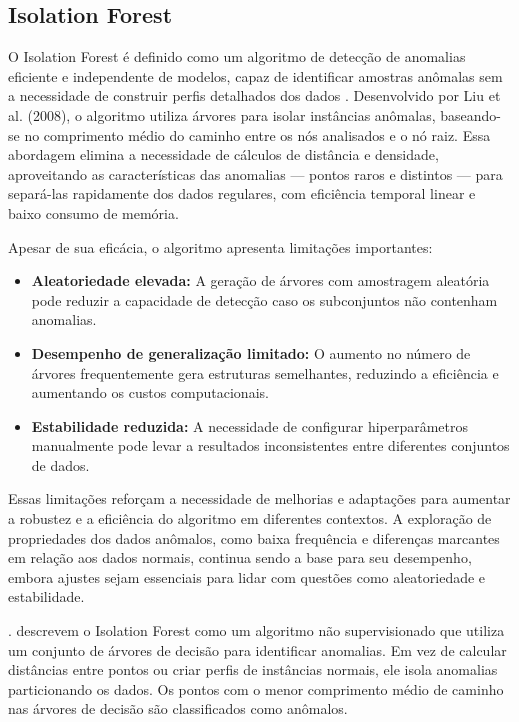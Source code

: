 \documentclass[12pt,a4paper]{article}
\begin{document}
\subsection{Isolation Forest}

O Isolation Forest é definido como um algoritmo de detecção de anomalias eficiente e independente de modelos, capaz de identificar amostras anômalas sem a necessidade de construir perfis detalhados dos dados \cite{chen2023}. Desenvolvido por Liu et al. (2008), o algoritmo utiliza árvores para isolar instâncias anômalas, baseando-se no comprimento médio do caminho entre os nós analisados e o nó raiz. Essa abordagem elimina a necessidade de cálculos de distância e densidade, aproveitando as características das anomalias — pontos raros e distintos — para separá-las rapidamente dos dados regulares, com eficiência temporal linear e baixo consumo de memória.

Apesar de sua eficácia, o algoritmo apresenta limitações importantes:
\begin{itemize}
    \item \textbf{Aleatoriedade elevada:} A geração de árvores com amostragem aleatória pode reduzir a capacidade de detecção caso os subconjuntos não contenham anomalias.
    \item \textbf{Desempenho de generalização limitado:} O aumento no número de árvores frequentemente gera estruturas semelhantes, reduzindo a eficiência e aumentando os custos computacionais.
    \item \textbf{Estabilidade reduzida:} A necessidade de configurar hiperparâmetros manualmente pode levar a resultados inconsistentes entre diferentes conjuntos de dados.
\end{itemize}

Essas limitações reforçam a necessidade de melhorias e adaptações para aumentar a robustez e a eficiência do algoritmo em diferentes contextos. A exploração de propriedades dos dados anômalos, como baixa frequência e diferenças marcantes em relação aos dados normais, continua sendo a base para seu desempenho, embora ajustes sejam essenciais para lidar com questões como aleatoriedade e estabilidade.

\cite{gupta2020}. descrevem o Isolation Forest como um algoritmo não supervisionado que utiliza um conjunto de árvores de decisão para identificar anomalias. Em vez de calcular distâncias entre pontos ou criar perfis de instâncias normais, ele isola anomalias particionando os dados. Os pontos com o menor comprimento médio de caminho nas árvores de decisão são classificados como anômalos.
\end{document}
